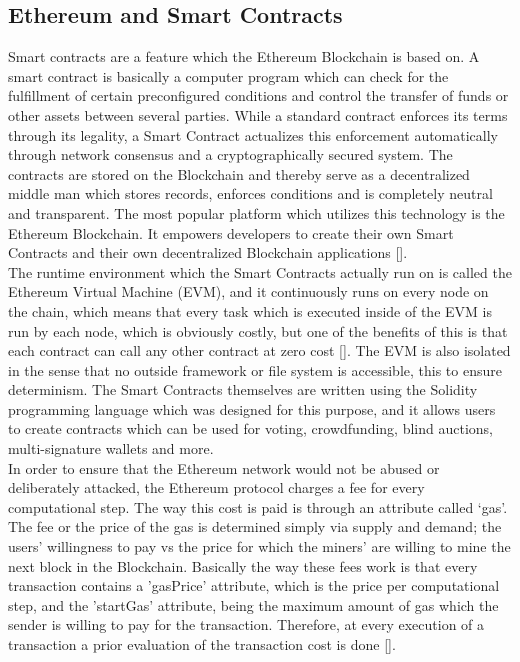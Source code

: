 \subsection{Ethereum and Smart Contracts}
Smart contracts are a feature which the Ethereum Blockchain is based on. A smart contract is basically a computer program which can check for the fulfillment of certain preconfigured conditions and control the transfer of funds or other assets between several parties. While a standard contract enforces its terms through its legality, a Smart Contract actualizes this enforcement automatically through network consensus and a cryptographically secured system. The contracts are stored on the Blockchain and thereby serve as a decentralized middle man which stores records, enforces conditions and is completely neutral and transparent. The most popular platform which utilizes this technology is the Ethereum Blockchain. It empowers developers to create their own Smart Contracts and their own decentralized Blockchain applications [\cite{Buterin2014}].  \\

The runtime environment which the Smart Contracts actually run on is called the Ethereum Virtual Machine (EVM), and it continuously runs on every node on the chain, which means that every task which is executed inside of the EVM is run by each node, which is obviously costly, but one of the benefits of this is that each contract can call any other contract at zero cost [\cite{Buterin2014}]. The EVM is also isolated in the sense that no outside framework or file system is accessible, this to ensure determinism. The Smart Contracts themselves are written using the Solidity programming language which was designed for this purpose, and it allows users to create contracts which can be used for voting, crowdfunding, blind auctions, multi-signature wallets and more.\\

In order to ensure that the Ethereum network would not be abused or deliberately attacked, the Ethereum protocol charges a fee for every computational step. The way this cost is paid is through an attribute called ‘gas’. The fee or the price of the gas is determined simply via supply and demand; the users’ willingness to pay vs the price for which the miners' are willing to mine the next block in the Blockchain. Basically the way these fees work is that every transaction contains a 'gasPrice' attribute, which is the price per computational step, and the 'startGas' attribute, being the maximum amount of gas which the sender is willing to pay for the transaction. Therefore, at every execution of a transaction a prior evaluation of the transaction cost is done [\cite{Buterin2014}].\\

